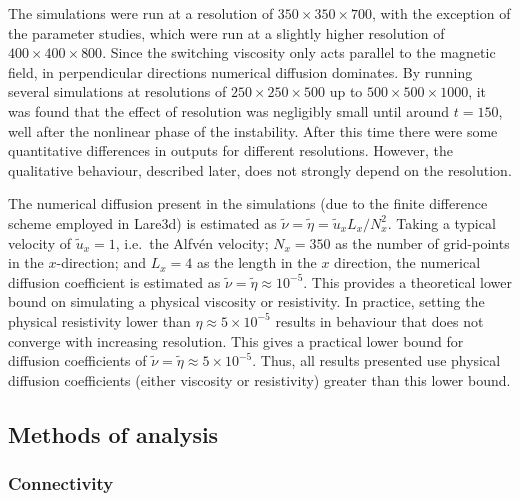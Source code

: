 The simulations were run at a resolution of $350 \times 350 \times 700$, with the exception of the parameter studies, which were run at a slightly higher resolution of $400 \times 400 \times 800$. Since the switching viscosity only acts parallel to the magnetic field, in perpendicular directions numerical diffusion dominates. By running several simulations at resolutions of $250 \times 250 \times 500$ up to $500 \times 500 \times 1000$, it was found that the effect of resolution was negligibly small until around $t=150$, well after the nonlinear phase of the instability. After this time there were some quantitative differences in outputs for different resolutions. However, the qualitative behaviour, described later, does not strongly depend on the resolution.

The numerical diffusion present in the simulations (due to the finite difference scheme employed in Lare3d) is estimated as $\tilde{\nu} = \tilde{\eta} = \tilde{u}_x L_x/N_x^2$. Taking a typical velocity of $\tilde{u}_x = 1$, i.e.\ the Alfv\'en velocity; $N_x = 350$ as the number of grid-points in the $x$-direction; and $L_x = 4$ as the length in the $x$ direction, the numerical diffusion coefficient is estimated as $\tilde{\nu} = \tilde{\eta} \approx 10^{-5}$. This provides a theoretical lower bound on simulating a physical viscosity or resistivity. In practice, setting the physical resistivity lower than $\eta \approx 5\times10^{-5}$ results in behaviour that does not converge with increasing resolution. This gives a practical lower bound for diffusion coefficients of $\tilde{\nu} = \tilde{\eta} \approx 5 \times 10^{-5}$. Thus, all results presented use physical diffusion coefficients (either viscosity or resistivity) greater than this lower bound.

\subsection{Methods of analysis}

\subsubsection{Connectivity}

